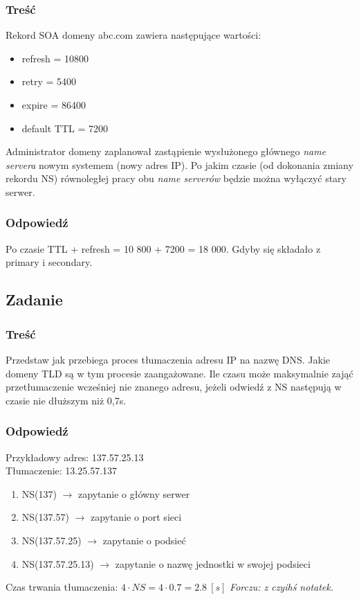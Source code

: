 		\subsubsection{Treść}
			Rekord SOA domeny abc.com zawiera następujące wartości:
			\begin{itemize}
				\item refresh = 10800
				\item retry = 5400
				\item expire = 86400
				\item default TTL = 7200
			\end{itemize}
			Administrator domeny zaplanował zastąpienie wysłużonego głównego \emph{name servera} nowym systemem (nowy adres IP). Po jakim czasie (od dokonania zmiany rekordu NS) równoległej pracy obu \emph{name serverów} będzie można wyłączyć stary serwer.
		\subsubsection{Odpowiedź}	
			Po czasie TTL + refresh = 10 800 + 7200 = 18 000. Gdyby się składało z primary i secondary.
	\subsection{Zadanie}
		\subsubsection{Treść}
			Przedstaw jak przebiega proces tłumaczenia adresu IP na nazwę DNS. Jakie domeny TLD są w tym procesie zaangażowane. Ile czasu może maksymalnie zająć przetłumaczenie wcześniej nie znanego adresu, jeżeli odwiedź z NS następują w czasie nie dłuższym niż 0,7s.
		\subsubsection{Odpowiedź}
			Przykładowy adres: 137.57.25.13\\
			Tłumaczenie: 13.25.57.137
			\begin{enumerate}
				\item NS(137) $ \rightarrow $ zapytanie o główny serwer
				\item NS(137.57) $ \rightarrow $ zapytanie o port sieci
				\item NS(137.57.25) $ \rightarrow $ zapytanie o podsieć
				\item NS(137.57.25.13) $ \rightarrow $ zapytanie o nazwę jednostki w swojej podsieci
			\end{enumerate}
			Czas trwania tłumaczenia: $ 4\cdot NS=4\cdot0.7=2.8\:[s] $
			{\small \emph{Forczu: z czyihś notatek.}}
			
